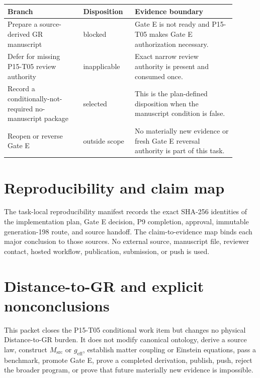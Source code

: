 \documentclass[11pt]{article}
\begin{document}
\begin{longtable}{p{0.30\linewidth}p{0.20\linewidth}p{0.40\linewidth}}
\toprule
Branch & Disposition & Evidence boundary \\
\midrule
\endhead
Prepare a source-derived GR manuscript & blocked & Gate E is not ready and
P15-T05 makes Gate E authorization necessary. \\
Defer for missing P15-T05 review authority & inapplicable & Exact narrow review
authority is present and consumed once. \\
Record a conditionally-not-required no-manuscript package & selected & This is
the plan-defined disposition when the manuscript condition is false. \\
Reopen or reverse Gate E & outside scope & No materially new evidence or fresh
Gate E reversal authority is part of this task. \\
\bottomrule
\end{longtable}

\section{Reproducibility and claim map}

The task-local reproducibility manifest records the exact SHA-256 identities of
the implementation plan, Gate E decision, P9 completion, approval, immutable
generation-198 route, and source handoff.  The claim-to-evidence map binds each
major conclusion to those sources.  No external source, manuscript file,
reviewer contact, hosted workflow, publication, submission, or push is used.

\section{Distance-to-GR and explicit nonconclusions}

This packet closes the P15-T05 conditional work item but changes no physical
Distance-to-GR burden.  It does not modify canonical ontology, derive a source
law, construct $M_{\mathrm{src}}$ or $g_{\mathrm{eff}}$, establish matter
coupling or Einstein equations, pass a benchmark, promote Gate E, prove a
completed derivation, publish, push, reject the broader program, or prove that
future materially new evidence is impossible.
\end{document}
